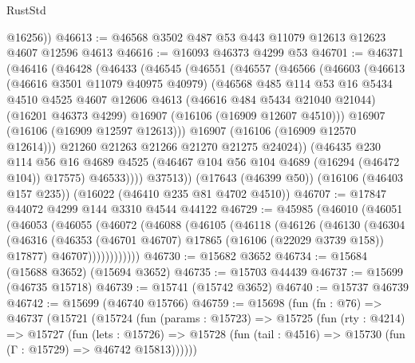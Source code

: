 \begin{lexlean}{RustStd}
\begin{coremodule}
        @16256))
@46613 := @46568 @3502 @487 @53 @443 @11079 @12613 @12623 @4607 @12596 @4613
@46616 := @16093 @46373 @4299 @53
@46701 := @46371
    (@46416
      (@46428
        (@46433
          (@46545
            (@46551
              (@46557
                (@46566
                  (@46603
                    (@46613
                      (@46616 @3501 @11079 @40975 @40979)
                      (@46568
                        @485
                        @114
                        @53
                        @16
                        @5434
                        @4510
                        @4525
                        @4607
                        @12606
                        @4613
                        (@46616 @484 @5434 @21040 @21044)
                        (@16201 @46373 @4299)
                        @16907
                        (@16106 (@16909 @12607 @4510)))
                      @16907
                      (@16106 (@16909 @12597 @12613)))
                    @16907
                    (@16106 (@16909 @12570 @12614)))
                  @21260
                  @21263
                  @21266
                  @21270
                  @21275
                  @24024))
              (@46435
                @230
                @114
                @56
                @16
                @4689
                @4525
                (@46467 @104 @56 @104 @4689 (@16294 (@46472 @104)) @17575)
                @46533))))
        @37513))
    (@17643 (@46399 @50))
    (@16106 (@46403 @157 @235))
    (@16022 (@46410 @235 @81 @4702 @4510))
@46707 := @17847 @44072 @4299 @144 @3310 @4544 @44122
@46729 := @45985
    (@46010
      (@46051
        (@46053
          (@46055
            (@46072
              (@46088
                (@46105
                  (@46118
                    (@46126
                      (@46130
                        (@46304
                          (@46316
                            (@46353 (@46701 @46707) @17865 (@16106 (@22029 @3739 @158)) @17877)
                            @46707))))))))))))
@46730 := @15682 @3652
@46734 := @15684 (@15688 @3652) (@15694 @3652)
@46735 := @15703 @44439
@46737 := @15699 (@46735 @15718)
@46739 := @15741 (@15742 @3652)
@46740 := @15737 @46739
@46742 := @15699 (@46740 @15766)
@46759 := @15698
    (fun (fn : @76) =>
    @46737
      (@15721
        (@15724
          (fun (params : @15723) =>
          @15725
            (fun (rty : @4214) =>
            @15727
              (fun (lets : @15726) =>
              @15728 (fun (tail : @4516) => @15730 (fun (Γ : @15729) => @46742 @15813))))))

\end{coremodule}
\end{lexlean}
